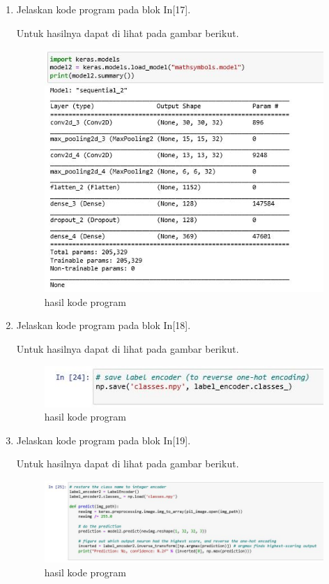 \begin{enumerate}
\item Jelaskan kode program pada blok  In[17].

Untuk hasilnya dapat di lihat pada gambar berikut.
\begin{figure}[ht]
\centering
\includegraphics[scale=0.4]{figures/1174012/chapter7/2,17.JPG}
\caption{hasil kode program}
\label{Contoh}
\end{figure}

\item Jelaskan kode program pada blok  In[18].

Untuk hasilnya dapat di lihat pada gambar berikut.
\begin{figure}[ht]
\centering
\includegraphics[scale=0.4]{figures/1174012/chapter7/2,18.JPG}
\caption{hasil kode program}
\label{Contoh}
\end{figure}

\item Jelaskan kode program pada blok  In[19].

Untuk hasilnya dapat di lihat pada gambar berikut.
\begin{figure}[ht]
\centering
\includegraphics[scale=0.4]{figures/1174012/chapter7/2,19.JPG}
\caption{hasil kode program}
\label{Contoh}
\end{figure}


\end{enumerate}
